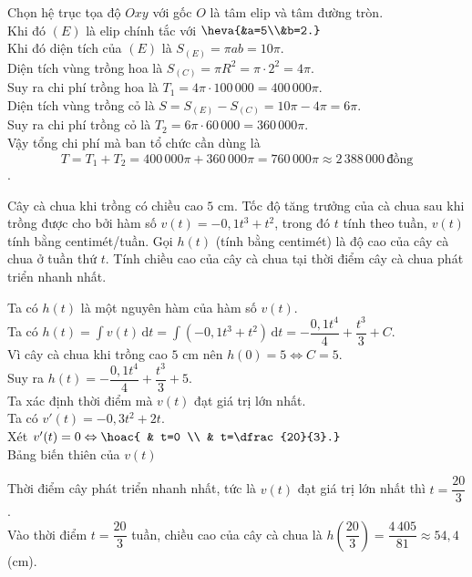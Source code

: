 \begin{ex}
{\begin{center}
\end{center}
Chọn hệ trục tọa độ $Oxy$ với gốc $O$ là tâm elip và tâm đường tròn. \\
Khi đó $(E)$ là elip chính tắc với $\heva{&a=5\\&b=2.}$ \\
Khi đó diện tích của $(E)$ là $S_{(E)}=\pi ab=10\pi$. \\
Diện tích vùng trồng hoa là $S_{(C)}=\pi R^2=\pi\cdot2^2=4\pi$. \\
Suy ra chi phí trồng hoa là $T_1=4\pi\cdot100\,000=400\,000\pi$. \\
Diện tích vùng trồng cỏ là $S=S_{(E)}-S_{(C)}=10\pi-4\pi=6\pi$. \\
Suy ra chi phí trồng cỏ là $T_2=6\pi\cdot60\,000=360\,000\pi$. \\
Vậy tổng chi phí mà ban tổ chức cần dùng là
\[T=T_1+T_2=400\,000\pi+360\,000\pi=760\,000\pi\approx2\,388\,000\,\text{đồng}\]. \\
}
\end{ex}

\begin{ex}%
Cây cà chua khi trồng có chiều cao $5$ cm. Tốc độ tăng trưởng của cà chua sau khi trồng được cho bởi hàm số $v(t)=-0{,}1t^3+t^2$, trong đó $t$ tính theo tuần, $v(t)$ tính bằng centimét/tuần. Gọi $h(t)$ (tính bằng centimét) là độ cao của cây cà chua ở tuần thứ $t$. Tính chiều cao của cây cà chua tại thời điểm cây cà chua phát triển nhanh nhất.
\loigiai
{
Ta có $h(t)$ là một nguyên hàm của hàm số $v(t)$. \\
Ta có $h(t)=\displaystyle\int v(t)\mathrm{\,d}t=\displaystyle\int \left(-0{,}1t^3+t^2\right)\mathrm{\,d}t=-\dfrac{0{,}1t^4}{4}+\dfrac{t^3}{3}+C$. \\
Vì cây cà chua khi trồng cao $5$ cm nên $h(0)=5 \Leftrightarrow C=5$.\\
Suy ra $h(t)=-\dfrac{0{,}1t^4}{4}+\dfrac{t^3}{3}+5$. \\
Ta xác định thời điểm mà $v(t)$ đạt giá trị lớn nhất. \\
Ta có $v'(t)=-0{,}3t^2+2t$. \\
Xét $v'(t)=0 \Leftrightarrow \hoac{ & t=0 \\ & t=\dfrac{20}{3}.}$ \\
Bảng biến thiên của $v(t)$
\begin{center}
\end{center}
Thời điểm cây phát triển nhanh nhất, tức là $v(t)$ đạt giá trị lớn nhất thì $t=\dfrac{20}{3}$.\\
Vào thời điểm $t=\dfrac{20}{3}$ tuần, chiều cao của cây cà chua là $h\left(\dfrac{20}{3}\right)=\dfrac{4\,405}{81}\approx54{,}4$ (cm).
}
\end{ex}

